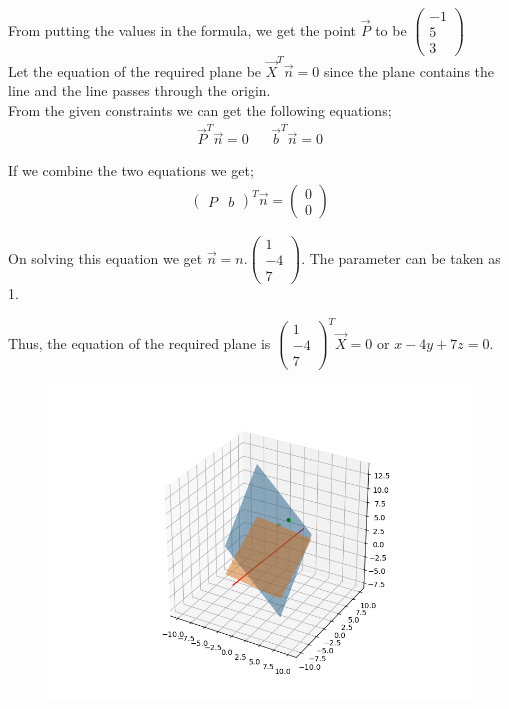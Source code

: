 \documentclass{beamer}
\theoremstyle{remark}
\newcommand{\myvec}[1]{\ensuremath{\begin{pmatrix}#1\end{pmatrix}}}
\numberwithin{equation}{section}
\begin{document}
\begin{frame}
From putting the values in the formula, we get the point $\Vec{P}$ to be $\myvec{-1 \\ 5 \\ 3}$\\

Let the equation of the required plane be $\Vec{X}^T\Vec{n}=0$ since the plane contains the line and the line passes through the origin. \\

From the given constraints we can get the following equations;
\begin{align}
\Vec{P}^T\Vec{n}=0 && \Vec{b}^T\Vec{n}=0
\end{align}

If we combine the two equations we get;
\begin{align}
\myvec{P & b}^T\Vec{n}=\myvec{0 \\ 0}
\end{align}

On solving this equation we get $\Vec{n}=n.\myvec{1 \\ -4 \\ 7}$. The parameter can be taken as 1. \\
\end{frame}

\begin{frame}
Thus, the equation of the required plane is $\myvec{1 \\ -4 \\ 7}^T\Vec{X}=0$ or $x-4y+7z=0$.


\begin{figure}[H]
\centering
\includegraphics[width=0.7\columnwidth]{figs/img.png}
\caption*{}
\end{figure}
\end{frame}
\end{document}
